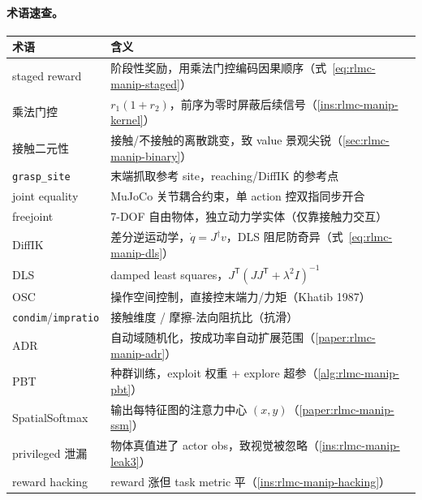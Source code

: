 \paragraph{术语速查。}
\begin{center}
\small
\begin{tabular}{@{}ll@{}}
\toprule
术语 & 含义 \\
\midrule
staged reward & 阶段性奖励，用乘法门控编码因果顺序（式~\eqref{eq:rlmc-manip-staged}） \\
乘法门控 & $r_1(1+r_2)$，前序为零时屏蔽后续信号（\cref{ins:rlmc-manip-kernel}） \\
接触二元性 & 接触/不接触的离散跳变，致 value 景观尖锐（\cref{sec:rlmc-manip-binary}） \\
\verb|grasp_site| & 末端抓取参考 site，reaching/DiffIK 的参考点 \\
joint equality & MuJoCo 关节耦合约束，单 action 控双指同步开合 \\
freejoint & 7-DOF 自由物体，独立动力学实体（仅靠接触力交互） \\
DiffIK & 差分逆运动学，$\dot q=J^\dagger v$，DLS 阻尼防奇异（式~\eqref{eq:rlmc-manip-dls}） \\
DLS & damped least squares，$J^{\mathsf T}(JJ^{\mathsf T}+\lambda^2 I)^{-1}$ \\
OSC & 操作空间控制，直接控末端力/力矩（Khatib 1987） \\
\verb|condim|/\verb|impratio| & 接触维度 / 摩擦-法向阻抗比（抗滑） \\
ADR & 自动域随机化，按成功率自动扩展范围（\cref{paper:rlmc-manip-adr}） \\
PBT & 种群训练，exploit 权重 + explore 超参（\cref{alg:rlmc-manip-pbt}） \\
SpatialSoftmax & 输出每特征图的注意力中心 $(x,y)$（\cref{paper:rlmc-manip-ssm}） \\
privileged 泄漏 & 物体真值进了 actor obs，致视觉被忽略（\cref{ins:rlmc-manip-leak3}） \\
reward hacking & reward 涨但 task metric 平（\cref{ins:rlmc-manip-hacking}） \\
\bottomrule
\end{tabular}
\end{center}


